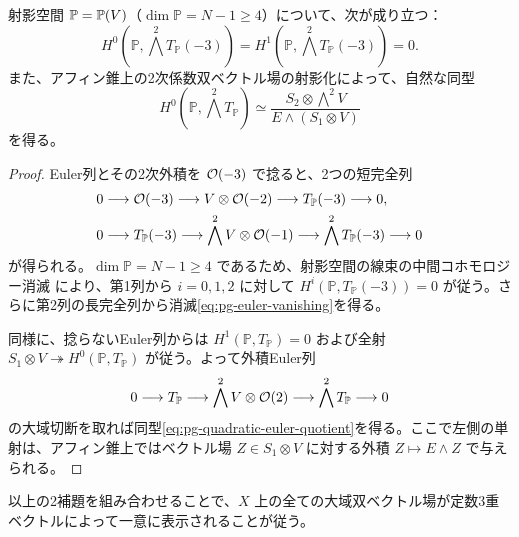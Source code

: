 \begin{lemma}\label{lem:pg-euler}
射影空間 $\mathbb P=\mathbb P(V)$（$\dim\mathbb P=N-1\ge4$）について、次が成り立つ：
\begin{equation}\label{eq:pg-euler-vanishing}
H^0(\mathbb P,\textstyle\bigwedge^2T_{\mathbb P}(-3))
=H^1(\mathbb P,\textstyle\bigwedge^2T_{\mathbb P}(-3))=0.
\end{equation}
また、アフィン錐上の2次係数双ベクトル場の射影化によって、自然な同型
\begin{equation}\label{eq:pg-quadratic-euler-quotient}
H^0(\mathbb P,\textstyle\bigwedge^2T_{\mathbb P})
\simeq
\frac{S_2\otimes\bigwedge^2V}
{E\wedge(S_1\otimes V)}
\end{equation}
を得る。
\end{lemma}
\begin{proof}
Euler列とその2次外積を $\mathcal O(-3)$ で捻ると、2つの短完全列
\begin{equation}\label{eq:pg-euler-sequences}
\begin{aligned}
0&\longrightarrow\mathcal O(-3)\longrightarrow V\otimes\mathcal O(-2)
\longrightarrow T_{\mathbb P}(-3)\longrightarrow0,\\
0&\longrightarrow T_{\mathbb P}(-3)
\longrightarrow\bigwedge^2V\otimes\mathcal O(-1)
\longrightarrow\bigwedge^2T_{\mathbb P}(-3)\longrightarrow0
\end{aligned}
\end{equation}
が得られる。$\dim\mathbb P=N-1\ge4$ であるため、射影空間の線束の中間コホモロジー消滅 \cite[Tag~01XT]{PStacks} により、第1列から $i=0,1,2$ に対して $H^i(\mathbb P,T_{\mathbb P}(-3))=0$ が従う。さらに第2列の長完全列から消滅\eqref{eq:pg-euler-vanishing}を得る。

同様に、捻らないEuler列からは $H^1(\mathbb P,T_{\mathbb P})=0$ および全射 $S_1\otimes V\twoheadrightarrow H^0(\mathbb P,T_{\mathbb P})$ が従う。よって外積Euler列
\[
  0\longrightarrow T_{\mathbb P}
  \longrightarrow\bigwedge^2V\otimes\mathcal O(2)
  \longrightarrow\bigwedge^2T_{\mathbb P}\longrightarrow0
\]
の大域切断を取れば同型\eqref{eq:pg-quadratic-euler-quotient}を得る。ここで左側の単射は、アフィン錐上ではベクトル場 $Z\in S_1\otimes V$ に対する外積 $Z\mapsto E\wedge Z$ で与えられる。
\end{proof}

以上の2補題を組み合わせることで、$X$ 上の全ての大域双ベクトル場が定数3重ベクトルによって一意に表示されることが従う。

